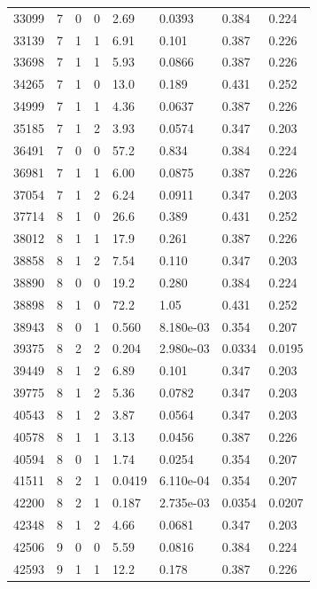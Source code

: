 \documentclass[preview]{standalone}
\begin{document}
{{{\begin{tabular}{L{1.2cm}C{1.2cm} C{0.3cm}C{0.5cm} C{1.4cm}C{1.4cm} C{1.4cm}C{1.4cm}}
  33099  &     7  & 0     &  0 &  2.69  & 0.0393  & 0.384 &  0.224   \\ 
  33139  &     7  & 1     &  1 &  6.91  & 0.101  & 0.387 &  0.226   \\ 
  33698  &     7  & 1     &  1 &  5.93  & 0.0866  & 0.387 &  0.226   \\ 
  34265  &     7  & 1     &  0 &  13.0  & 0.189  & 0.431 &  0.252   \\ 
  34999  &     7  & 1     &  1 &  4.36  & 0.0637  & 0.387 &  0.226   \\ 
  35185  &     7  & 1     &  2 &  3.93  & 0.0574  & 0.347 &  0.203   \\ 
  36491  &     7  & 0     &  0 &  57.2  & 0.834  & 0.384 &  0.224   \\ 
  36981  &     7  & 1     &  1 &  6.00  & 0.0875  & 0.387 &  0.226   \\ 
  37054  &     7  & 1     &  2 &  6.24  & 0.0911  & 0.347 &  0.203   \\ 
  37714  &     8  & 1     &  0 &  26.6  & 0.389  & 0.431 &  0.252   \\ 
  38012  &     8  & 1     &  1 &  17.9  & 0.261  & 0.387 &  0.226   \\ 
  38858  &     8  & 1     &  2 &  7.54  & 0.110  & 0.347 &  0.203   \\ 
  38890  &     8  & 0     &  0 &  19.2  & 0.280  & 0.384 &  0.224   \\ 
  38898  &     8  & 1     &  0 &  72.2  & 1.05  & 0.431 &  0.252   \\ 
  38943  &     8  & 0     &  1 &  0.560  & 8.180e-03  & 0.354 &  0.207   \\ 
  39375  &     8  & 2     &  2 &  0.204  & 2.980e-03  & 0.0334 &  0.0195   \\ 
  39449  &     8  & 1     &  2 &  6.89  & 0.101  & 0.347 &  0.203   \\ 
  39775  &     8  & 1     &  2 &  5.36  & 0.0782  & 0.347 &  0.203   \\ 
  40543  &     8  & 1     &  2 &  3.87  & 0.0564  & 0.347 &  0.203   \\ 
  40578  &     8  & 1     &  1 &  3.13  & 0.0456  & 0.387 &  0.226   \\ 
  40594  &     8  & 0     &  1 &  1.74  & 0.0254  & 0.354 &  0.207   \\ 
  41511  &     8  & 2     &  1 &  0.0419  & 6.110e-04  & 0.354 &  0.207   \\ 
  42200  &     8  & 2     &  1 &  0.187  & 2.735e-03  & 0.0354 &  0.0207   \\ 
  42348  &     8  & 1     &  2 &  4.66  & 0.0681  & 0.347 &  0.203   \\ 
  42506  &     9  & 0     &  0 &  5.59  & 0.0816  & 0.384 &  0.224   \\ 
  42593  &     9  & 1     &  1 &  12.2  & 0.178  & 0.387 &  0.226   \\ 
\hline 
\end{tabular} 

}}}
\end{document}
